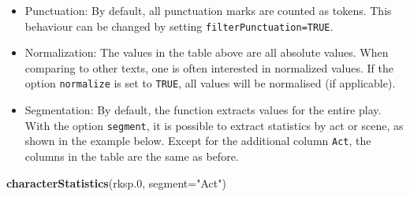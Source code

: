 \documentclass[]{book}
\newenvironment{Shaded}{\begin{snugshade}}{\end{snugshade}}
\newcommand{\DataTypeTok}[1]{\textcolor[rgb]{0.13,0.29,0.53}{#1}}
\newcommand{\FloatTok}[1]{\textcolor[rgb]{0.00,0.00,0.81}{#1}}
\newcommand{\KeywordTok}[1]{\textcolor[rgb]{0.13,0.29,0.53}{\textbf{#1}}}
\newcommand{\NormalTok}[1]{#1}
\newcommand{\StringTok}[1]{\textcolor[rgb]{0.31,0.60,0.02}{#1}}
\begin{document}
\begin{itemize}
\item
  Punctuation: By default, all punctuation marks are counted as tokens. This behaviour can be changed by setting \texttt{filterPunctuation=TRUE}.
\item
  Normalization: The values in the table above are all absolute values. When comparing to other texts, one is often interested in normalized values. If the option \texttt{normalize} is set to \texttt{TRUE}, all values will be normalised (if applicable).
\item
  Segmentation: By default, the function extracts values for the entire play. With the option \texttt{segment}, it is possible to extract statistics by act or scene, as shown in the example below. Except for the additional column \texttt{Act}, the columns in the table are the same as before.
\end{itemize}

\begin{Shaded}
\begin{Highlighting}[]
\KeywordTok{characterStatistics}\NormalTok{(rksp}\FloatTok{.0}\NormalTok{, }
                    \DataTypeTok{segment=}\StringTok{"Act"}\NormalTok{)}
\end{Highlighting}
\end{Shaded}
\end{document}

